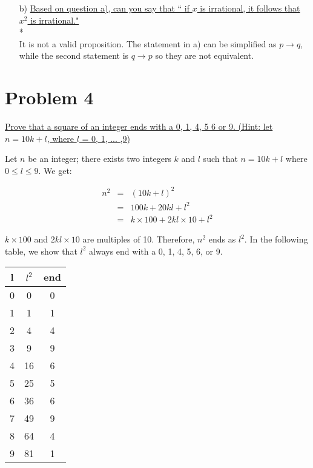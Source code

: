 \documentclass[11pt]{article}
\begin{document}
{\begin{itemize}
	\item [b)] {\underline{Based on question a), can you say that `` if $x$ is irrational, it follows that $x^2$ is irrational."}}\\*\\
	
	It is not a valid proposition. The statement in a) can be simplified as $p \rightarrow q$, while the second statement is $q \rightarrow p$ so they are not equivalent. 
	
	\end{itemize}
	

			
	
	\section*{Problem 4} 
	
{\underline{Prove that a square of an integer ends with a 0, 1, 4, 5 6 or 9. (Hint: let $n = 10k+l$, where $l$ = 0, 1, ... ,9)}}\newline

Let $n$ be an integer; there exists two integers $k$ and $l$ such that $n = 10k + l$ where $0 \leq l \leq 9$. We get:

\begin{eqnarray*}
n^{2} & = & (10k + l)^{2}\\
& = & 100k + 20kl + l^{2}\\
& = & k \times 100 + 2kl \times 10 + l^{2}
\end{eqnarray*}

$k \times 100$ and $2kl \times 10$ are multiples of 10. Therefore, $n^{2}$ ends as $l^{2}$. In the following table, we show that $l^{2}$ always end with a 0, 1, 4, 5, 6, or 9.

\begin{table}[!hbt]
\begin{tabular}{|c|c|c|}
\hline
l & $l^{2}$ & end\\
\hline
0 & 0 & 0\\
1 & 1 & 1\\
2 & 4 & 4\\
3 & 9 & 9\\
4 & 16 & 6\\
5 & 25 & 5\\
6 & 36 & 6\\
7 & 49 & 9\\
8 & 64 & 4\\
9 & 81 & 1\\
\hline
\end{tabular}
\end{table}

}
\end{document}

